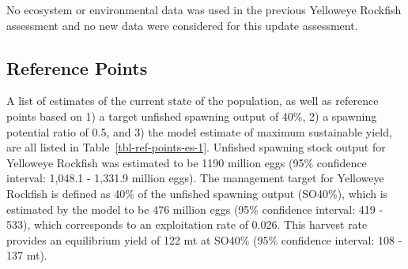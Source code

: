 \documentclass[
]{scrartcl}
\begin{document}
No ecosystem or environmental data was used in the previous Yelloweye
Rockfish assessment and no new data were considered for this update
assessment.

\subsection*{Reference Points}\label{reference-points}

A list of estimates of the current state of the population, as well as
reference points based on 1) a target unfished spawning output of 40\%,
2) a spawning potential ratio of 0.5, and 3) the model estimate of
maximum sustainable yield, are all listed in
Table~\ref{tbl-ref-points-es-1}. Unfished spawning stock output for
Yelloweye Rockfish was estimated to be 1190 million eggs (95\%
confidence interval: 1,048.1 - 1,331.9 million eggs). The management
target for Yelloweye Rockfish is defined as 40\% of the unfished
spawning output (SO40\%), which is estimated by the model to be 476
million eggs (95\% confidence interval: 419 - 533), which corresponds to
an exploitation rate of 0.026. This harvest rate provides an equilibrium
yield of 122 mt at SO40\% (95\% confidence interval: 108 - 137 mt).

\clearpage

\begingroup
\fontsize{9.0pt}{10.8pt}\selectfont
\end{document}
